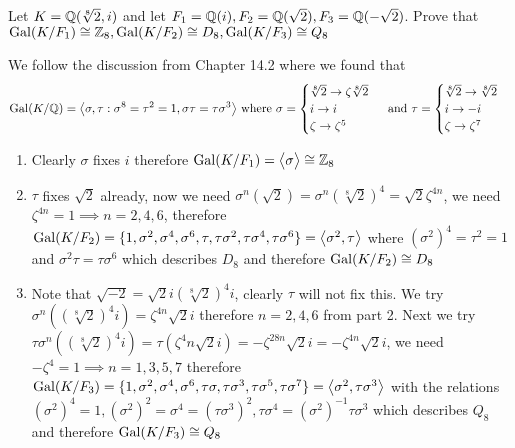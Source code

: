 \begin{exercise}
    Let $K = \mathbb{Q}(\sqrt[8]{2}, i)$ and let $F_1 = \mathbb{Q}(i), F_2 = \mathbb{Q}(\sqrt{2}), F_3 = \mathbb{Q}(-\sqrt{2})$. Prove that $\operatorname{Gal}(K/F_1) \cong \mathbb{Z}_8, \operatorname{Gal}(K/F_2) \cong D_8, \operatorname{Gal}(K/F_3) \cong Q_8$
\end{exercise}
\begin{solution}
    We follow the discussion from Chapter 14.2 where we found that \[\operatorname{Gal}(K/\mathbb{Q}) = \big< \sigma, \tau : \sigma^8 = \tau^2 = 1, \sigma\tau = \tau\sigma^3 \big> \text{ where } \sigma = \begin{cases}
        \sqrt[8]{2} \to \zeta\sqrt[8]{2} \\
        i \to i \\
        \zeta \to \zeta^5
    \end{cases} \text{ and } \tau = \begin{cases}
        \sqrt[8]{2} \to \sqrt[8]{2} \\
        i \to -i \\
        \zeta \to \zeta^7
    \end{cases}\]
    \begin{enumerate}
        \item Clearly $\sigma$ fixes $i$ therefore $\operatorname{Gal}(K/F_1) = \big< \sigma \big> \cong \mathbb{Z}_8$
        
        \item $\tau$ fixes $\sqrt{2}$ already, now we need $\sigma^n(\sqrt{2}) = \sigma^n(\sqrt[8]{2})^4 = \sqrt{2}\zeta^{4n}$, we need $\zeta^{4n} = 1 \implies n = 2, 4, 6$, therefore $\operatorname{Gal}(K/F_2) = \{1, \sigma^2, \sigma^4, \sigma^6, \tau, \tau\sigma^2, \tau\sigma^4, \tau\sigma^6\} = \big< \sigma^2, \tau \big>$ where $(\sigma^2)^4 = \tau^2 = 1$ and $\sigma^2\tau = \tau\sigma^6$ which describes $D_8$ and therefore $\operatorname{Gal}(K/F_2) \cong D_8$
        
        \item Note that $\sqrt{-2} = \sqrt{2}i (\sqrt[8]{2})^4i$, clearly $\tau$ will not fix this. We try $\sigma^n((\sqrt[8]{2})^4i) = \zeta^{4n}\sqrt{2}i$ therefore $n = 2, 4, 6$ from part 2. Next we try $\tau\sigma^n((\sqrt[8]{2})^4i) = \tau(\zeta^4n\sqrt{2}i) = -\zeta^{28n}\sqrt{2}i = -\zeta^{4n}\sqrt{2}i$, we need $-\zeta^4 = 1 \implies n = 1, 3, 5, 7$ therefore $\operatorname{Gal}(K/F_3) = \{1, \sigma^2, \sigma^4, \sigma^6, \tau\sigma, \tau\sigma^3, \tau\sigma^5, \tau\sigma^7\} = \big< \sigma^2, \tau\sigma^3 \big>$ with the relations $(\sigma^2)^4 = 1, (\sigma^2)^2 = \sigma^4 = (\tau\sigma^3)^2, \tau\sigma^4=(\sigma^2)^{-1}\tau\sigma^3$ which describes $Q_8$ and therefore $\operatorname{Gal}(K/F_3) \cong Q_8$
        \end{enumerate}
\end{solution}

